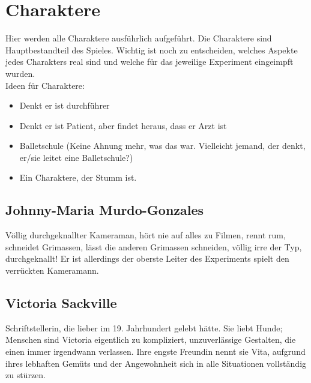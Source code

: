 \documentclass[a4paper, 12pt]{scrartcl}
\begin{document}
    \section{Charaktere}
    Hier werden alle Charaktere ausführlich aufgeführt. Die Charaktere sind Hauptbestandteil des Spieles. Wichtig ist noch zu entscheiden, welches Aspekte jedes Charakters \glqq real\grqq{} sind und welche für das jeweilige Experiment \glqq eingeimpft\grqq{} wurden.\\
    Ideen für Charaktere:
    \begin{itemize}
    \item Denkt er ist durchführer
    \item Denkt er ist Patient, aber findet heraus, dass er Arzt ist
    \item Balletschule (Keine Ahnung mehr, was das war. Vielleicht jemand, der denkt, er/sie leitet eine Balletschule?)
    \item Ein Charaktere, der Stumm ist.
    \end{itemize}

    \subsection{Johnny-Maria Murdo-Gonzales}
    Völlig durchgeknallter Kameraman, hört nie auf alles zu Filmen, rennt rum, schneidet Grimassen, lässt die anderen Grimassen schneiden, völlig irre der Typ, durchgeknallt! 
    Er ist allerdings der oberste Leiter des Experiments \glqq spielt\grqq{} den verrückten Kameramann. 
    
    \subsection{Victoria Sackville}
    Schriftstellerin, die lieber im 19. Jahrhundert gelebt hätte. Sie liebt Hunde; Menschen sind Victoria eigentlich zu kompliziert, unzuverlässige Gestalten, die einen immer irgendwann verlassen. Ihre engste Freundin nennt sie Vita, aufgrund ihres lebhaften Gemüts und der Angewohnheit sich in alle Situationen vollständig zu stürzen.
\end{document}
